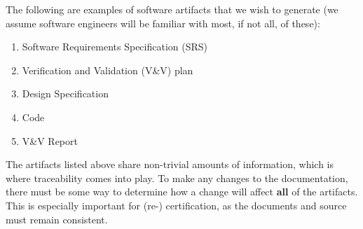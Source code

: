 \documentclass{sig-alternate-05-2015}
\begin{document}
The following are examples of software artifacts
that we wish to generate (we assume software engineers will be familiar with
most, if not all, of these):
\begin{enumerate}
\item Software Requirements Specification (SRS)
\item Verification and Validation (V\&V) plan
\item Design Specification
\item Code
\item V\&V Report 
\end{enumerate}

The artifacts listed above share non-trivial amounts of information, which is
where traceability comes into play. To make any changes to the documentation,
there must be some way to determine how a change will affect \textbf{all} of the
artifacts. This is especially important for (re-) certification, as the
documents and source must remain consistent.
\end{document}
